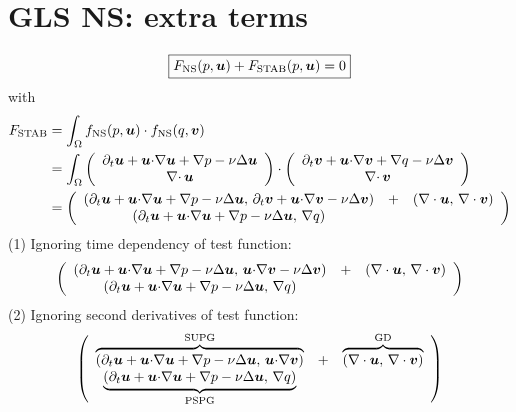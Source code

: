 \documentclass[review,onefignum,onetabnum]{siamart190516}
\begin{document}

\section{GLS NS: extra terms}
\begin{align*}
\boxed{F_{\text{NS}}(p,{\boldsymbol u}) + F_{\text{STAB}}(p,{\boldsymbol u}) = 0}
\end{align*}
with
\begin{equation}
\begin{aligned}
F_{\text{STAB}} &= \int_\Omega f_{\text{NS}}(p,{\boldsymbol u}) \cdot f_{\text{NS}}(q,{\boldsymbol v})
\\&=\int_\Omega
\left(
\begin{array}{c}
    \partial_t {\boldsymbol u}  + {\boldsymbol u} {\cdot} \nabla {\boldsymbol u} 
    + \nabla p - \nu \Delta \bm u \\
    \nabla{\cdot\,} {\boldsymbol u} 
\end{array}
\right)
\cdot
\left(
\begin{array}{c}
    \partial_t {\boldsymbol v}  + {\boldsymbol u} {\cdot} \nabla {\boldsymbol v} 
    + \nabla q - \nu \Delta {\boldsymbol v} \\
    \nabla{\cdot\,} {\boldsymbol v}
\end{array}
\right)
\\&=
\left(
\begin{array}{ccc}
    (\partial_t {\boldsymbol u}  + {\boldsymbol u} {\cdot} \nabla {\boldsymbol u} 
    + \nabla p - \nu \Delta \bm u ,\,\partial_t {\boldsymbol v}  + {\boldsymbol u} {\cdot} \nabla {\boldsymbol v} 
    - \nu \Delta {\boldsymbol v}) &+& (\nabla \cdot {\boldsymbol u},\, \nabla \cdot {\boldsymbol v}) \\
    (\partial_t {\boldsymbol u}  + {\boldsymbol u} {\cdot} \nabla {\boldsymbol u} 
    + \nabla p - \nu \Delta \bm u,\, \nabla q)
\end{array}
\right)
  \end{aligned}
\end{equation}
(1) Ignoring time dependency of test function:
\begin{equation}
  \begin{aligned}
\left(
\begin{array}{ccc}
    (\partial_t {\boldsymbol u}  + {\boldsymbol u} {\cdot} \nabla {\boldsymbol u} 
    + \nabla p - \nu \Delta \bm u ,\,{\boldsymbol u} {\cdot} \nabla {\boldsymbol v} 
    - \nu \Delta {\boldsymbol v}) &+ & (\nabla \cdot {\boldsymbol u},\, \nabla \cdot {\boldsymbol v}) \\
    (\partial_t {\boldsymbol u}  + {\boldsymbol u} {\cdot} \nabla {\boldsymbol u} 
    + \nabla p - \nu \Delta \bm u,\, \nabla q)
\end{array}
\right)
  \end{aligned}
\end{equation}
(2) Ignoring second derivatives of test function:
\begin{equation}
  \begin{aligned}
\left(
\begin{array}{ccc}
    \overbrace{(\partial_t {\boldsymbol u}  + {\boldsymbol u} {\cdot} \nabla {\boldsymbol u} 
    + \nabla p  - \nu \Delta \bm u ,\,{\boldsymbol u} {\cdot} \nabla {\boldsymbol v})}^{\text{SUPG}} &+ & 
    \overbrace{(\nabla \cdot {\boldsymbol u},\, \nabla \cdot {\boldsymbol v})}^{\text{GD}} \\
    \underbrace{(\partial_t {\boldsymbol u}  + {\boldsymbol u} {\cdot} \nabla {\boldsymbol u} 
    + \nabla p - \nu \Delta \bm u,\, \nabla q)}_{\text{PSPG}} &&
\end{array}
\right)
  \end{aligned}
\end{equation}
\end{document}
